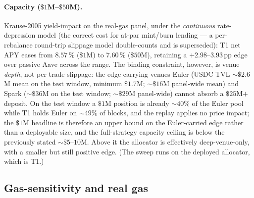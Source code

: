 \paragraph{Capacity ($\$1$M--$\$50$M).} Krause-2005 yield-impact on the
real-gas panel, under the \emph{continuous} rate-depression model (the
correct cost for at-par mint/burn lending --- a per-rebalance round-trip
slippage model double-counts and is superseded): T1 net APY eases from
$8.57$\,\% ($\$1$M) to $7.60$\,\% ($\$50$M), retaining a
$+2.98$--$3.93$\,pp edge over passive Aave across the range. The binding
constraint, however, is venue \emph{depth}, not per-trade slippage: the
edge-carrying venues Euler (USDC TVL $\sim\$2.6$M mean on the test
window, minimum $\$1.7$M; $\sim\$16$M panel-wide mean) and Spark
($\sim\$36$M on the test window; $\sim\$29$M panel-wide) cannot absorb a
$\$25$M$+$ deposit.  On the test window a $\$1$M position is already
$\sim 40\%$ of the Euler pool while T1 holds Euler on $\sim 49\%$ of
blocks, and the replay applies no price impact; the $\$1$M headline is
therefore an upper bound on the Euler-carried edge rather than a
deployable size, and the full-strategy capacity ceiling is below the
previously stated $\sim\$5$--$10$M.  Above it the allocator is
effectively deep-venue-only, with a smaller but still positive edge.
(The sweep runs on the deployed allocator, which is T1.)

\subsection{Gas-sensitivity and real gas}
\label{sec:emp-gas}

